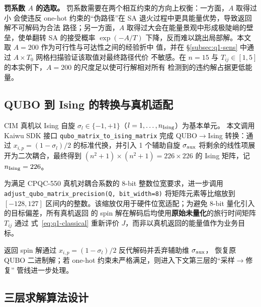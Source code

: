 \documentclass[UTF8,12pt,a4paper]{ctexart}
\begin{document}
\textbf{罚系数 $A$ 的选取。} 罚系数需要在两个相互约束的方向上权衡：一方面，$A$ 取得过小
会使违反 one-hot 约束的``伪路径''在 SA 退火过程中更具能量优势，导致返回解不可解码为合法
路径；另一方面，$A$ 取得过大会在能量景观中形成极陡峭的壁垒，使单翻转 SA 的接受概率
$\exp(-A/T)$ 下降，反而难以跳出局部解。本文取 $A=200$ 作为可行性与可达性之间的经验折中
值，并在 §\ref{subsec:q1-sens} 中通过 $A\times T_{0}$ 网格扫描验证该取值对最终路径代价
不敏感。在 $n=15$ 与 $T_{ij}\in[1,5]$ 的本实例下，$A=200$ 的尺度足以使可行解相对所有
检测到的违约解占据更低能量。

\subsection{QUBO 到 Ising 的转换与真机适配}

CIM 真机以 Ising 自旋 $\sigma_{l}\in\{-1,+1\}$（$l=1,\dots,n_{\rm Ising}$）为基本单元。
本文调用 Kaiwu SDK 接口 \texttt{qubo\_matrix\_to\_ising\_matrix} 完成 QUBO$\to$Ising
转换：通过 $x_{i,p}=(1-\sigma_{l})/2$ 的标准代换，并引入 1 个辅助自旋 $\sigma_{\rm aux}$
将剩余的线性项展开为二次耦合，最终得到 $(n^{2}+1)\times(n^{2}+1)=226\times 226$ 的 Ising
矩阵，记 $n_{\rm Ising}=226$。

为满足 CPQC-550 真机对耦合系数的 8-bit 整数位宽要求，进一步调用
\texttt{adjust\_qubo\_matrix\_precision(Q, bit\_width=8)} 将矩阵元素等比缩放到 $[-128,127]$
区间内的整数。该缩放仅用于硬件位宽适配；为避免 8-bit 量化引入的目标偏差，所有真机返回
的 spin 解在解码后均使用\textbf{原始未量化}的旅行时间矩阵 $T_{ij}$ 通过
式~\eqref{eq:q1-classical} 重新评价 $J$，而非以真机返回的能量值作为业务目标。

返回 spin 解通过 $x_{i,p}=(1-\sigma_{l})/2$ 反代解码并丢弃辅助维 $\sigma_{\rm aux}$，
恢复原 QUBO 二进制解；若 one-hot 约束未严格满足，则进入下文第三层的``采样$\to$修复''
管线进一步处理。

\subsection{三层求解算法设计}
\label{subsec:q1-algo}
\end{document}
